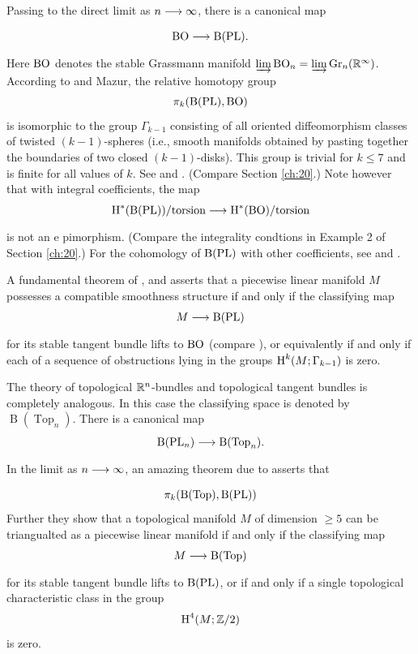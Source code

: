 \documentclass[../main]{subfiles}
\begin{document}
Passing to the direct limit as $n \varrightarrow{} \infty$, there is a canonical map \[\BO \varrightarrow{} \operatorname{B}(\PL).\] Here $\operatorname{BO}$ denotes the stable Grassmann manifold $\varinjlim \operatorname{BO}_n = \varinjlim \operatorname{Gr}_n(\mathbb R^\infty)$. According to \cite{hirsch1959} and Mazur, the relative homotopy group \[\pi_k(\operatorname{B}(\operatorname{PL}), \operatorname{BO})\] is isomorphic to the group $\Gamma_{k-1}$ consisting of all oriented diffeomorphism classes of twisted $(k-1)$-spheres (i.e., smooth manifolds obtained by pasting together the boundaries of two closed $(k-1)$-disks). This group is trivial for $k \leq 7$ and is finite for all values of $k$. See \cite{kervaire-milnor} and \cite{cerf}.  (Compare Section \ref{ch:20}.) Note however that with integral coefficients, the map \[\homology^\ast(\operatorname{B}(\PL))/\text{torsion} \varrightarrow{} \homology^\ast(\BO)/\text{torsion}\]
is not an e pimorphism. (Compare the integrality condtions in Example 2 of Section \ref{ch:20}.) For the cohomology of $\operatorname{B}(\operatorname{PL})$ with other coefficients, see \cite{williamson} and \cite{brumfiel}.  

A fundamental theorem of \cite{hirsch1959},\cite{munkres1964} and \cite{munkres1968} asserts that a piecewise linear manifold $M$ possesses a compatible smoothness structure if and only if the classifying map \[M \varrightarrow{} \operatorname{B}(\PL) \] for its stable tangent bundle lifts to $\operatorname{BO}$ (compare \cite{milnor1965}), or equivalently if and only if each of a sequence of obstructions lying in the groups $\operatorname{H}^k(M;\Gamma_{k-1})$ is zero.

The theory of topological $\mathbb R^n$-bundles and topological tangent bundles is completely analogous. In this case the classifying space is denoted by $\operatorname{B}(\operatorname{Top}_n)$. There is a canonical map \[\operatorname{B}(\PL_n) \varrightarrow{} \operatorname{B}(\operatorname{Top}_n).\] In the limit as $n \varrightarrow{} \infty$, an amazing theorem due to \cite{Kirby1969OnTT} asserts that  \[\pi_k(\operatorname{B}(\operatorname{Top}),\operatorname{B}(\operatorname{PL}))\]  Further they show that a topological manifold $M$ of dimension $\geq 5$ can be triangualted as a piecewise linear manifold if and only if the classifying map \[M \varrightarrow{} \operatorname{B}(\operatorname{Top})\] for its stable tangent bundle lifts to $\operatorname{B}(\operatorname{PL})$, or if and only if a single topological characteristic class in the group \[\operatorname{H}^4(M;\mathbb{Z}/2)\] is zero.
\end{document}
